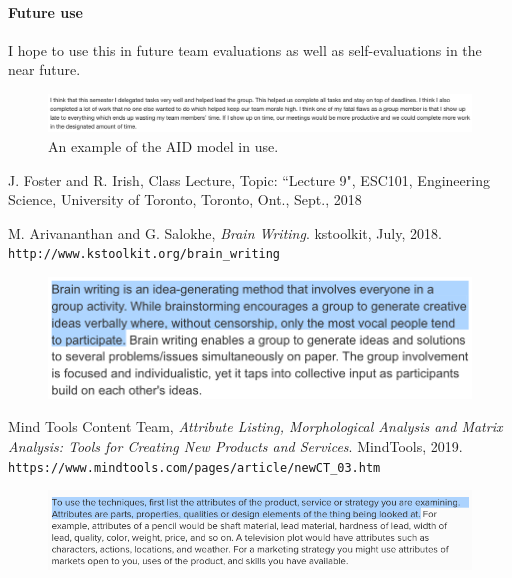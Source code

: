 \documentclass[paper=a4, fontsize=11pt]{article} %
\begin{document}
            \paragraph{Future use}
            I hope to use this in future team evaluations as well as self-evaluations in the near future.
            \begin{figure}[H]
                \centering
	            \includegraphics[width=1\linewidth]{aid.png}
	            \caption{An example of the AID model in use.}
            \end{figure}
            
\begin{thebibliography}{50}
J. Foster and R. Irish, Class Lecture, Topic: ``Lecture 9", ESC101, Engineering Science, University of Toronto, Toronto, Ont., Sept., 2018

M. Arivananthan and G. Salokhe, \textit{Brain Writing}. kstoolkit, July, 2018.
\\\texttt{http://www.kstoolkit.org/brain\_writing}
\begin{figure}[H]
    \centering
    \includegraphics[width=1\linewidth]{write.png}
\end{figure}

Mind Tools Content Team, \textit{Attribute Listing, Morphological Analysis and Matrix Analysis: Tools for Creating New Products and Services}. MindTools, 2019.\\\texttt{https://www.mindtools.com/pages/article/newCT\_03.htm}
\begin{figure}[H]
    \centering
    \includegraphics[width=1\linewidth]{listy.png}
\end{figure}



\end{thebibliography}
\end{document}
